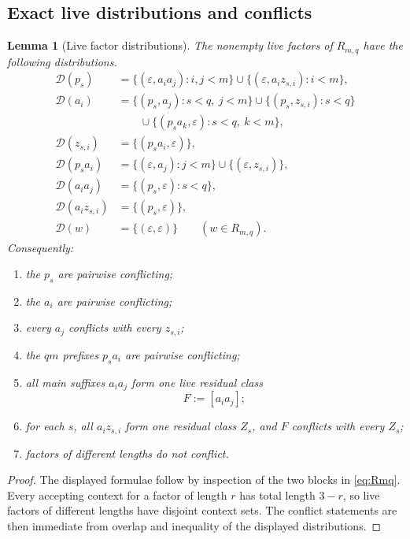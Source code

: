 \documentclass[11pt]{article}
\newtheorem{lemma}[definition]{Lemma}
\newcommand{\D}{\mathcal D}
\newcommand{\eps}{\varepsilon}
\begin{document}
\subsection{Exact live distributions and conflicts}

\begin{lemma}[Live factor distributions]
\label{lem:distributions}
The nonempty live factors of $R_{m,q}$ have the following distributions.
\begin{align*}
\D(p_s)
 &=\{(\eps,a_i a_j):i,j<m\}
   \cup\{(\eps,a_i z_{s,i}):i<m\},\\
\D(a_i)
 &=\{(p_s,a_j):s<q,\ j<m\}
   \cup\{(p_s,z_{s,i}):s<q\}\\
 &\qquad\cup\{(p_sa_k,\eps):s<q,\ k<m\},\\
\D(z_{s,i})
 &=\{(p_sa_i,\eps)\},\\
\D(p_sa_i)
 &=\{(\eps,a_j):j<m\}\cup\{(\eps,z_{s,i})\},\\
\D(a_i a_j)
 &=\{(p_s,\eps):s<q\},\\
\D(a_i z_{s,i})
 &=\{(p_s,\eps)\},\\
\D(w)&=\{(\eps,\eps)\}\qquad(w\in R_{m,q}).
\end{align*}
Consequently:
\begin{enumerate}[label=(\roman*)]
\item the $p_s$ are pairwise conflicting;
\item the $a_i$ are pairwise conflicting;
\item every $a_j$ conflicts with every $z_{s,i}$;
\item the $qm$ prefixes $p_sa_i$ are pairwise conflicting;
\item all main suffixes $a_i a_j$ form one live residual class
\[
 F:=[a_i a_j];
\]
\item for each $s$, all $a_i z_{s,i}$ form one residual class $Z_s$, and
$F$ conflicts with every $Z_s$;
\item factors of different lengths do not conflict.
\end{enumerate}
\end{lemma}

\begin{proof}
The displayed formulae follow by inspection of the two blocks in
\eqref{eq:Rmq}.  Every accepting context for a factor of length $r$ has total
length $3-r$, so live factors of different lengths have disjoint context sets.
The conflict statements are then immediate from overlap and inequality of the
displayed distributions.
\end{proof}
\end{document}
